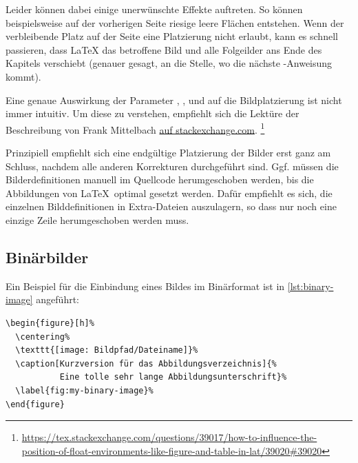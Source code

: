 Leider können dabei einige unerwünschte Effekte auftreten.
So können beispielsweise auf der vorherigen Seite riesige leere Flächen entstehen.
Wenn der verbleibende Platz auf der Seite eine Platzierung nicht erlaubt,
kann es schnell passieren, dass \LaTeX{} das betroffene Bild 
und alle Folgeilder ans Ende des Kapitels verschiebt
(genauer gesagt, an die Stelle, wo die nächste -Anweisung kommt).

Eine genaue Auswirkung der Parameter
, ,  und 
auf die Bildplatzierung ist nicht immer intuitiv.
Um diese zu verstehen, empfiehlt sich die Lektüre der Beschreibung
von Frank Mittelbach
\href{https://tex.stackexchange.com/questions/39017/how-to-influence-the-position-of-float-environments-like-figure-and-table-in-lat/39020#39020}{auf stackexchange.com}.%
\footnote{\url{https://tex.stackexchange.com/questions/39017/how-to-influence-the-position-of-float-environments-like-figure-and-table-in-lat/39020#39020}}

Prinzipiell empfiehlt sich eine endgültige Platzierung der Bilder erst ganz am Schluss,
nachdem alle anderen Korrekturen durchgeführt sind.
Ggf. müssen die Bilderdefinitionen manuell im Quellcode herumgeschoben werden,
bis die Abbildungen von \LaTeX\ optimal gesetzt werden.
Dafür empfiehlt es sich, die einzelnen Bilddefinitionen in Extra-Dateien auszulagern,
so dass nur noch eine einzige Zeile herumgeschoben werden muss.

\subsection[Binärbilder]{Binärbilder}%
\label{sec:Binaerbilder}
%
Ein Beispiel für die Einbindung eines Bildes im Binärformat ist in \cref{lst:binary-image} angeführt:

\begin{lstlisting}[caption={Einbindung einer Binärgrafik in LaTeX},label={lst:binary-image},language={[LaTeX]TeX},float={htbp}]
\begin{figure}[h]%
  \centering%
  \texttt{[image: Bildpfad/Dateiname]}%
  \caption[Kurzversion für das Abbildungsverzeichnis]{%
           Eine tolle sehr lange Abbildungsunterschrift}%
  \label{fig:my-binary-image}%
\end{figure}
\end{lstlisting}

